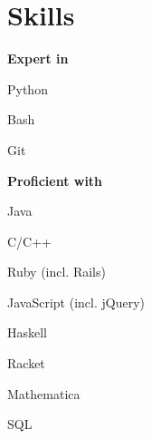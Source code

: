 \documentclass[]{resume}
\begin{document}
\begin{minipage}[t]{0.33\textwidth}


\section{Skills}
\textbf{Expert in}
\vspace{\topsep} %
\begin{tightemize}
\item Python
\item Bash
\item Git
\end{tightemize}
\sectionsep

\textbf{Proficient with}
\begin{tightemize}
\item Java
\item C/C++
\item Ruby (incl. Rails)
\item JavaScript (incl. jQuery)
\item Haskell
\item Racket
\item Mathematica
\item SQL
\end{tightemize}
\sectionsep



%
%

\end{minipage}
\hfill
\end{document}
